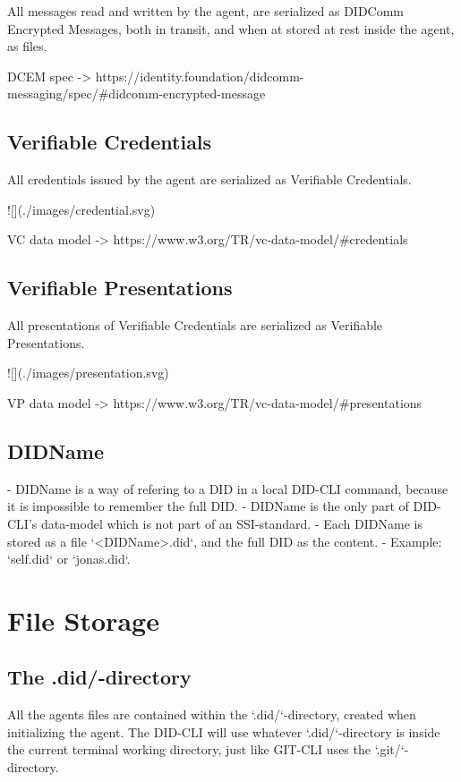 All messages read and written by the agent, are serialized as DIDComm Encrypted Messages, both in transit, and when at stored at rest inside the agent, as files.

DCEM spec -> https://identity.foundation/didcomm-messaging/spec/#didcomm-encrypted-message

\subsection{Verifiable Credentials}

All credentials issued by the agent are serialized as Verifiable Credentials.

![](./images/credential.svg)

VC data model -> https://www.w3.org/TR/vc-data-model/#credentials

\subsection{Verifiable Presentations}

All presentations of Verifiable Credentials are serialized as Verifiable Presentations.

![](./images/presentation.svg)

VP data model -> https://www.w3.org/TR/vc-data-model/#presentations

\subsection{DIDName}

- DIDName is a way of refering to a DID in a local DID-CLI command, because it is impossible to remember the full DID.
- DIDName is the only part of DID-CLI's data-model which is not part of an SSI-standard.
- Each DIDName is stored as a file `<DIDName>.did`, and the full DID as the content.
- Example: `self.did` or `jonas.did`.




\section{File Storage}

\subsection{The .did/-directory}

All the agents files are contained within the `.did/`-directory, created when initializing the agent. The DID-CLI will use whatever `.did/`-directory is inside the current terminal working directory, just like GIT-CLI uses the `.git/`-directory.

